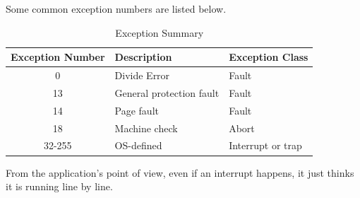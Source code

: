 \documentclass{article}
\begin{document}
    \begin{example}
      Some common exception numbers are listed below. 
      \begin{table}[H]
        \centering
        \caption{Exception Summary}
        \begin{tabular}{|c|l|l|}
        \hline
        \textbf{Exception Number} & \textbf{Description} & \textbf{Exception Class} \\ \hline
        0 & Divide Error & Fault \\ \hline
        13 & General protection fault & Fault \\ \hline
        14 & Page fault & Fault \\ \hline
        18 & Machine check & Abort \\ \hline
        32-255 & OS-defined & Interrupt or trap \\ \hline
        \end{tabular}
      \end{table}
    \end{example}

    From the application's point of view, even if an interrupt happens, it just thinks it is running line by line. 
\end{document}
